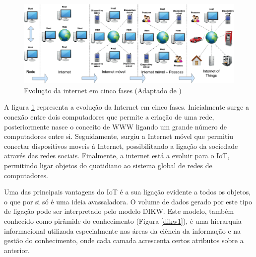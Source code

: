 \begin{figure}[h]
	\centering
	\includegraphics[width=\linewidth]{esquemas/iot-diagram.pdf}
	\caption[Evolução da internet em cinco fases]{ Evolução da internet em cinco fases (Adaptado de \cite{Our2013})}
	\label{iotEvolution}
\end{figure}


A figura \ref{iotEvolution} representa a evolução da Internet em cinco fases. Inicialmente surge a conexão entre dois computadores que permite a criação de uma rede, posteriormente nasce o conceito de \ac{WWW} ligando um grande número de computadores entre si. Seguidamente, surgiu a Internet móvel que permitiu conectar dispositivos moveis à Internet, possibilitando a ligação da sociedade através das redes sociais.
Finalmente, a internet está a evoluir para o \ac{IoT}, permitindo ligar objetos do quotidiano ao sistema global de redes de computadores\cite{Our2013}.









Uma das principais vantagens do IoT é a sua ligação evidente a todos os objetos, o que por si só é uma ideia avassaladora. O volume de dados gerado por este tipo de ligação pode ser interpretado pelo modelo \ac{DIKW}\cite{Rowley2007}. Este modelo, também conhecido como pirâmide do conhecimento (Figura \ref{dikw1}), é uma hierarquia informacional utilizada especialmente nas áreas da ciência da informação e na gestão do conhecimento, onde cada camada acrescenta certos atributos sobre a anterior.


